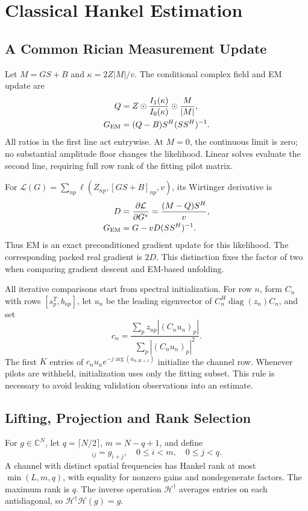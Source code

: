 \documentclass[10pt,journal,letterpaper]{IEEEtran}
\newcommand{\HH}{\mathcal{H}}
\DeclareMathOperator{\diag}{diag}
\begin{document}
\section{Classical Hankel Estimation}
\label{sec:classical}
\subsection{A Common Rician Measurement Update}
Let $M=GS+B$ and $\kappa=2Z|M|/v$. The conditional complex field and EM update are
\begin{align}
 Q&=Z\odot\frac{I_1(\kappa)}{I_0(\kappa)}\odot\frac{M}{|M|},\\
 G_{\rm EM}&=(Q-B)S^H(SS^H)^{-1}.
 \label{eq:em}
\end{align}
All ratios in the first line act entrywise. At $M=0$, the continuous limit is zero; no substantial amplitude floor changes the likelihood. Linear solves evaluate the second line, requiring full row rank of the fitting pilot matrix.

For $\mathcal L(G)=\sum_{np}\ell(Z_{np},[GS+B]_{np},v)$, its Wirtinger derivative is
\begin{align}
 D&=\frac{\partial\mathcal L}{\partial G^*}=\frac{(M-Q)S^H}{v},\nonumber\\
 G_{\rm EM}&=G-vD(SS^H)^{-1}.
 \label{eq:gradient}
\end{align}
Thus EM is an exact preconditioned gradient update for this likelihood. The corresponding packed real gradient is $2D$. This distinction fixes the factor of two when comparing gradient descent and EM-based unfolding.

All iterative comparisons start from spectral initialization. For row $n$, form $C_n$ with rows $[s_p^T,b_{np}]$, let $u_n$ be the leading eigenvector of $C_n^H\diag(z_n)C_n$, and set
\begin{equation}
 c_n=\frac{\sum_p z_{np}|(C_nu_n)_p|}{\sum_p|(C_nu_n)_p|^2}.
\end{equation}
The first $K$ entries of $c_nu_ne^{-j\arg(u_{n,K+1})}$ initialize the channel row. Whenever pilots are withheld, initialization uses only the fitting subset. This rule is necessary to avoid leaking validation observations into an estimate.

\subsection{Lifting, Projection and Rank Selection}
For $g\in\mathbb C^N$, let $q=\lceil N/2\rceil$, $m=N-q+1$, and define
\begin{equation}
 [\HH(g)]_{ij}=g_{i+j},\quad 0\le i<m,\quad0\le j<q.
\end{equation}
A channel with distinct spatial frequencies has Hankel rank at most $\min(L,m,q)$, with equality for nonzero gains and nondegenerate factors. The maximum rank is $q$. The inverse operation $\HH^\dagger$ averages entries on each antidiagonal, so $\HH^\dagger\HH(g)=g$.
\end{document}
